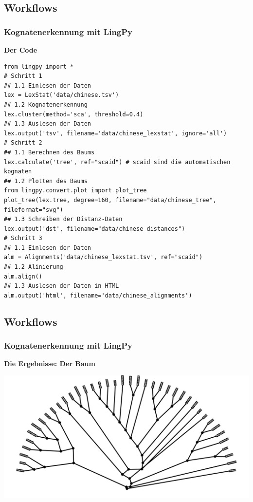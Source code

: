 \subsection{\texorpdfstring{{Workflows}}{Workflows}}

\subsubsection{\texorpdfstring{{Kognatenerkennung mit
LingPy}}{Kognatenerkennung mit LingPy}}

\textbf{Der Code}

\begin{verbatim}
from lingpy import *
# Schritt 1
## 1.1 Einlesen der Daten
lex = LexStat('data/chinese.tsv')
## 1.2 Kognatenerkennung
lex.cluster(method='sca', threshold=0.4)
## 1.3 Auslesen der Daten
lex.output('tsv', filename='data/chinese_lexstat', ignore='all')
# Schritt 2
## 1.1 Berechnen des Baums
lex.calculate('tree', ref="scaid") # scaid sind die automatischen kognaten
## 1.2 Plotten des Baums
from lingpy.convert.plot import plot_tree
plot_tree(lex.tree, degree=160, filename="data/chinese_tree", fileformat="svg")
## 1.3 Schreiben der Distanz-Daten
lex.output('dst', filename="data/chinese_distances")
# Schritt 3
## 1.1 Einlesen der Daten
alm = Alignments('data/chinese_lexstat.tsv', ref="scaid")
## 1.2 Alinierung
alm.align()
## 1.3 Auslesen der Daten in HTML
alm.output('html', filename='data/chinese_alignments')
\end{verbatim}

\subsection{\texorpdfstring{{Workflows}}{Workflows}}

\subsubsection{\texorpdfstring{{Kognatenerkennung mit
LingPy}}{Kognatenerkennung mit LingPy}}

\textbf{Die Ergebnisse: Der Baum}

\href{../code/data/chinese_tree.svg}{\includegraphics{../code/data/chinese_tree.svg}}


